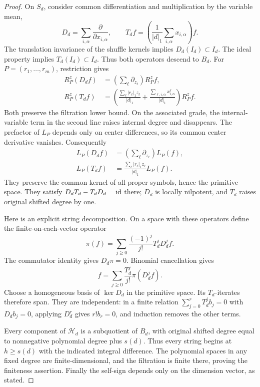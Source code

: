 \begin{proof}
On $S_d$, consider common differentiation and multiplication by the
variable mean,
\[
 D_d=\sum_{i,\alpha}\frac{\partial}{\partial x_{i,\alpha}},
 \qquad
 T_d f=\left(\frac1{|d|_1}\sum_{i,\alpha}x_{i,\alpha}\right)f.
\]
The translation invariance of the shuffle kernels implies
$D_d(I_d)\subset I_d$.  The ideal property implies
$T_d(I_d)\subset I_d$.  Thus both operators descend to $B_d$.
For $P=(r_1,\ldots,r_m)$, restriction gives
\begin{align*}
 R_P^z(D_df)&=\left(\sum_\ell\partial_{z_\ell}\right)R_P^zf,\\
 R_P^z(T_df)&=
 \left(\frac{\sum_\ell|r_\ell|_1z_\ell}{|d|_1}
       +\frac{\sum_{\ell,i,\alpha}x^\ell_{i,\alpha}}{|d|_1}
 \right)R_P^zf.
\end{align*}
Both preserve the filtration lower bound.  On the associated grade,
the internal-variable term in the second line raises internal degree
and disappears.  The prefactor of $L_P$ depends only on center
differences, so its common center derivative vanishes.  Consequently
\begin{align*}
 L_P(D_df)&=\left(\sum_\ell\partial_{z_\ell}\right)L_P(f),\\
 L_P(T_df)&=
       \frac{\sum_\ell|r_\ell|_1z_\ell}{|d|_1}L_P(f).
\end{align*}
They preserve the common kernel of all proper symbols, hence the
primitive space.  They satisfy $D_dT_d-T_dD_d=\operatorname{id}$ there; $D_d$ is
locally nilpotent, and $T_d$ raises original shifted degree by one.

Here is an explicit string decomposition.  On a space with these
operators define the finite-on-each-vector operator
\[
 \pi(f)=\sum_{j\ge0}\frac{(-1)^j}{j!}T_d^jD_d^jf.
\]
The commutator identity gives $D_d\pi=0$.  Binomial cancellation
gives
\[
 f=\sum_{j\ge0}\frac{T_d^j}{j!}\pi(D_d^jf).
\]
Choose a homogeneous basis of $\ker D_d$ in the primitive space.
Its $T_d$-iterates therefore span.  They are independent: in a finite
relation $\sum_{j=0}^rT_d^jb_j=0$ with $D_db_j=0$, applying
$D_d^r$ gives $r!b_r=0$, and induction removes the other terms.

Every component of $\mathcal H_d$ is a subquotient of $B_d$, with
original shifted degree equal to nonnegative polynomial degree plus
$s(d)$.  Thus every string begins at $h\ge s(d)$ with the indicated
integral difference.  The polynomial spaces in any fixed degree are
finite-dimensional, and the filtration is finite there, proving
the finiteness assertion.  Finally the self-sign depends only on the
dimension vector, as stated.
\end{proof}

